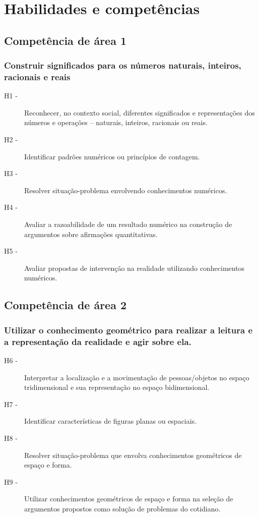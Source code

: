 \chapter*{Habilidades e competências}
\section*{Competência de área 1}
    \subsection*{Construir significados para os números naturais, inteiros, racionais e reais}
    	\begin{description}
    		\item[H1 -]Reconhecer, no contexto social, diferentes significados e representações dos números e operações – naturais, inteiros,
    		racionais ou reais.
    		\item[H2 -]Identificar padrões numéricos ou princípios de contagem.
    		\item[H3 -]Resolver situação-problema envolvendo conhecimentos numéricos.
    		\item[H4 -]Avaliar a razoabilidade de um resultado numérico na construção de argumentos sobre afirmações quantitativas.
    		\item[H5 -]Avaliar propostas de intervenção na realidade utilizando conhecimentos numéricos.
    	\end{description}
	
\section*{Competência de área 2}
    \subsection*{Utilizar o conhecimento geométrico para realizar a leitura e a
    	representação da realidade e agir sobre ela.}
    	\begin{description}
    		\item [H6 -]Interpretar a localização e a movimentação de pessoas/objetos no espaço tridimensional e sua representação no espaço bidimensional.
    		\item [H7 -]Identificar características de figuras planas ou espaciais.
    		\item [H8 -]Resolver situação-problema que envolva conhecimentos geométricos de espaço e forma.
    		\item [H9 -]Utilizar conhecimentos geométricos de espaço e forma na seleção de argumentos propostos como solução de problemas do cotidiano.
    	\end{description}

